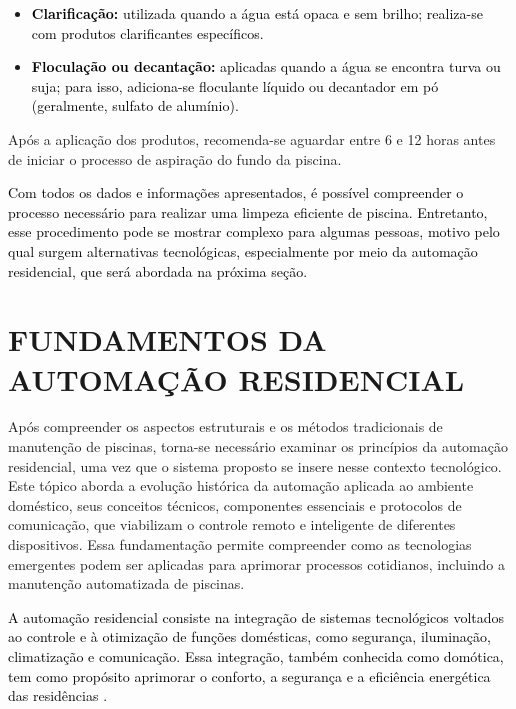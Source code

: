 \begin{itemize}
            \begin{itemize}
                \item \textbf{\textcolor{black}{Clarificação:}} \textcolor{black}{utilizada quando a água está opaca e sem brilho; realiza-se com produtos clarificantes específicos.}
                
                \item \textbf{\textcolor{black}{Floculação ou decantação:}} \textcolor{black}{aplicadas quando a água se encontra turva ou suja; para isso, adiciona-se floculante líquido ou decantador em pó (geralmente, sulfato de alumínio).}
            \end{itemize}

            Após a aplicação dos produtos, recomenda-se aguardar entre 6 e 12 horas antes de iniciar o processo de aspiração do fundo da piscina.

            
        \end{itemize}

        \textcolor{black}{Com todos os dados e informações apresentados, é possível compreender o processo necessário para realizar uma limpeza eficiente de piscina. Entretanto, esse procedimento pode se mostrar complexo para algumas pessoas, motivo pelo qual surgem alternativas tecnológicas, especialmente por meio da automação residencial, que será abordada na próxima seção.}
         
   
\section{FUNDAMENTOS DA AUTOMAÇÃO RESIDENCIAL}

    Após compreender os aspectos estruturais e os métodos tradicionais de manutenção de piscinas, torna-se necessário examinar os princípios da automação residencial, uma vez que o sistema proposto se insere nesse contexto tecnológico. Este tópico aborda a evolução histórica da automação aplicada ao ambiente doméstico, seus conceitos técnicos, componentes essenciais e protocolos de comunicação, que viabilizam o controle remoto e inteligente de diferentes dispositivos. Essa fundamentação permite compreender como as tecnologias emergentes podem ser aplicadas para aprimorar processos cotidianos, incluindo a manutenção automatizada de piscinas.

    \textcolor{black}{A automação residencial consiste na integração de sistemas tecnológicos voltados ao controle e à otimização de funções domésticas, como segurança, iluminação, climatização e comunicação. Essa integração, também conhecida como domótica, tem como propósito aprimorar o conforto, a segurança e a eficiência energética das residências \cite{automacaoResidencialCap1}.}

